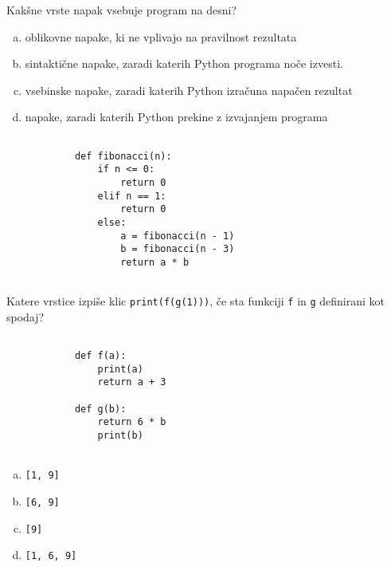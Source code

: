 \documentclass[arhiv, 10pt]{../izpit}
\newcommand{\inlinepy}[1]{\texttt{#1}}
\begin{document}
        \naloga*
        \begin{multicols}{2}
        \noindent
        Kakšne vrste napak vsebuje program na desni?

        \begin{enumerate}[(a)]
\item oblikovne napake, ki ne vplivajo na pravilnost rezultata
\item sintaktične napake, zaradi katerih Python programa noče izvesti.
\item vsebinske napake, zaradi katerih Python izračuna napačen rezultat
\item napake, zaradi katerih Python prekine z izvajanjem programa
\end{enumerate}

        \columnbreak

        \begin{verbatim}
        
            def fibonacci(n):
                if n <= 0:
                    return 0
                elif n == 1:
                    return 0
                else:
                    a = fibonacci(n - 1)
                    b = fibonacci(n - 3)
                    return a * b
            
        \end{verbatim}

        \end{multicols}

    
        \naloga*
        Katere vrstice izpiše klic \inlinepy{print(f(g(1)))}, če sta funkciji \inlinepy{f} in \inlinepy{g} definirani kot spodaj?

        \begin{multicols}{2}
        \begin{verbatim}
        
            def f(a):
                print(a)
                return a + 3

            def g(b):
                return 6 * b
                print(b)
        
        \end{verbatim}

        \begin{enumerate}[(a)]
\item \inlinepy{[1, 9]}
\item \inlinepy{[6, 9]}
\item \inlinepy{[9]}
\item \inlinepy{[1, 6, 9]}
\end{enumerate}

        \end{multicols}
    
\end{document}
